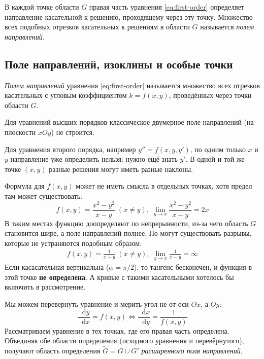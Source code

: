 \documentclass[12pt,a4paper]{article}
\numberwithin{equation}{section}
\newcommand{\dd}{\mathop{}\!\mathrm{d}}
\begin{document}
В каждой точке области \(G\) правая часть уравнения \eqref{eq:first-order} определяет направление касательной к решению, проходящему через эту точку. Множество всех подобных отрезков касательных к решениям в области \(G\) называется \textit{полем направлений}.

\subsection{Поле направлений, изоклины и особые точки}

\begin{definitionHSE}
\textit{Полем направлений} уравнения \eqref{eq:first-order} называется множество всех отрезков касательных с угловым коэффициентом \(k=f(x,y)\), проведённых через точки области \(G\).
\end{definitionHSE}

\begin{remarkHSE}
Для уравнений высших порядков классическое двумерное поле направлений (на плоскости \(xOy\)) не строится.

Для уравнения второго порядка, например $y''=f(x,y,y')$, по одним только \(x\) и \(y\) направление уже определить нельзя: нужно ещё знать \(y'\). В одной и той же точке \((x,y)\) разные решения могут иметь разные наклоны.
\end{remarkHSE}

Формула для \(f(x,y)\) может не иметь смысла в отдельных точках, хотя предел там может существовать:
\[
f(x,y)=\frac{x^2-y^2}{x-y}\;(x\neq y),\;\lim_{y\rightarrow x}\frac{x^2-y^2}{x-y}=2x
\]
В таким местах функцию доопределяют по непрерывности, из-за чего область \(G\) становится шире, а поле направлений полнее. Но могут существовать разрывы, которые не устраняются подобным образом:
\begin{gather*}
f(x,y)=\frac{1}{x-y}\;(x\neq y),\;\lim_{y\rightarrow x}\frac{1}{x-y}=\infty
\end{gather*}
Если касасательная вертикальна (\(\alpha=\pi/2\)), то тангенс бесконечен, и функция в этой точке \textbf{не определена}. А кривые с такими касательными хотелось бы включить в рассмотрение.

Мы можем перевернуть уравнение и мерить угол не от оси \(Ox\), а \(Oy\):
\[
\frac{\dd y}{\dd x}=f(x,y)\iff\frac{\dd x}{\dd y}=\frac{1}{f(x,y)}
\]
Рассматриваем уравнение в тех точках, где его правая часть определена. Объединяя обе области определения (исходного уравнения и перевёрнутого), получают область определения \(\tilde{G} = G \cup G'\) \textit{расширенного поля направлений}.
\end{document}
